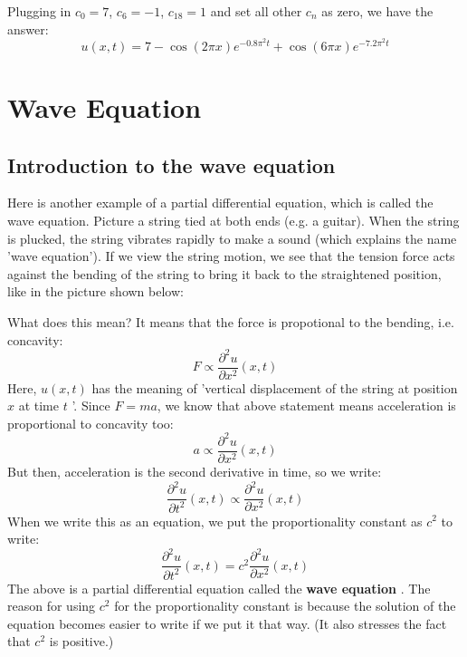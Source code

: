 \documentclass[12pt]{report}
\begin{document}
Plugging in $c_0=7$, $c_6=-1$, $c_{18}=1$ and set all other $c_n$ as zero, we have the answer:
$$u(x,t) = 7 - \cos \left( 2\pi x \right) e^{-0.8 \pi^2 t}+\cos \left( 6\pi x \right) e^{-7.2\pi^2 t}$$

\section{Wave Equation}

\subsection*{Introduction to the wave equation}

Here is another example of a partial differential equation, which is called the wave equation. Picture a string tied at both ends (e.g. a guitar). When the string is plucked, the string vibrates rapidly to make a sound (which explains the name 'wave equation'). If we view the string motion, we see that the tension force acts against the bending of the string to bring it back to the straightened position, like in the picture shown below:
\begin{center}  \end{center}
What does this mean? It means that the force is propotional to the bending, i.e. concavity:
$$ F \propto \frac{\partial^2 u}{\partial x^2}(x,t)$$
Here, $u(x,t)$ has the meaning of 'vertical displacement of the string at position $x$ at time $t$ '.
Since $F=ma$, we know that above statement means acceleration is proportional to concavity too:
$$ a \propto \frac{\partial^2 u}{\partial x^2}(x,t)$$
But then, acceleration is the second derivative in time, so we write:
$$ \frac{\partial^2 u}{\partial t^2}(x,t) \propto \frac{\partial^2 u}{\partial x^2}(x,t)$$
When we write this as an equation, we put the proportionality constant as $c^2$ to write:
$$ \frac{\partial^2 u}{\partial t^2}(x,t) = c^2 \frac{\partial^2 u}{\partial x^2}(x,t)$$
The above is a partial differential equation called the \textbf{wave equation }. The reason for using $c^2$ for the proportionality constant is because the solution of the equation becomes easier to write if we put it that way. (It also stresses the fact that $c^2$ is positive.)
\end{document}
